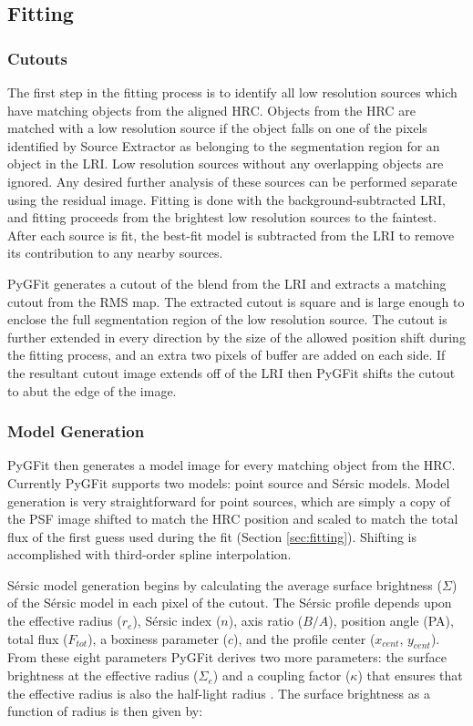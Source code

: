 \documentclass[preprint]{aastex}
\newcommand{\sersic}{S\'{e}rsic}
\newcommand{\pygfit}{PyGFit}
\newcommand{\extractor}{Source Extractor}
\begin{document}
\subsection{Fitting}\label{sec:fitting_procedure}

\subsubsection{Cutouts}

The first step in the fitting process is to identify all low resolution sources which have matching objects from the aligned HRC.  Objects from the HRC are matched with a low resolution source if the object falls on one of the pixels identified by \extractor{} as belonging to the segmentation region for an object in the LRI.  Low resolution sources without any overlapping objects are ignored. Any desired further analysis of these sources can be performed separate using the residual image.  Fitting is done with the background-subtracted LRI, and fitting proceeds from the brightest low resolution sources to the faintest.  After each source is fit, the best-fit  model is subtracted from the LRI to remove its contribution to any nearby sources.

\pygfit{} generates a cutout of the blend from the LRI and extracts a matching cutout from the RMS map.  The extracted cutout is square and is large enough to enclose the full segmentation region of the low resolution source.  The cutout is further extended in every direction by the size of the allowed position shift during the fitting process, and an extra two pixels of buffer are added on each side.  If the resultant cutout image extends off of the LRI then \pygfit{} shifts the cutout to abut the edge of the image.

\subsubsection{Model Generation}\label{sec:modeling}

\pygfit{} then generates a model image for every matching object from the HRC.  Currently \pygfit{} supports two models: point source and \sersic{} models.  Model generation is very straightforward for point sources, which are simply a copy of the PSF image shifted to match the HRC position and scaled to match the total flux of the first guess used during the fit (Section \ref{sec:fitting}).  Shifting is accomplished with third-order spline interpolation.

\sersic{} model generation begins by calculating the average surface brightness ($\Sigma$) of the \sersic{} model in each pixel of the cutout.  The \sersic{} profile depends upon the effective radius ($r_e$), \sersic{} index ($n$), axis ratio ($B/A$), position angle (PA), total flux ($F_{tot}$), a boxiness parameter ($c$), and the profile center ($x_{cent}$, $y_{cent}$).  From these eight parameters \pygfit{} derives two more parameters: the surface brightness at the effective radius ($\Sigma_e$) and a coupling factor ($\kappa$) that ensures that the effective radius is also the half-light radius \citep[see for example][]{peng02}.  The surface brightness as a function of radius is then given by:
\end{document}
